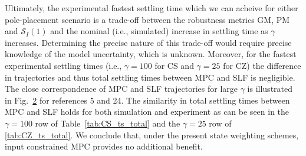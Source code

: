 \documentclass[twocolumn,twoside]{IEEEtran}
\begin{document}
\begin{figure*}[h!]
  \begin{subfigure}{1\columnwidth}
    
    \caption{
    }
  \label{fig:min_gam_traj}
\end{subfigure}
\hfill
\begin{subfigure}{1\columnwidth}
  
  \caption{
  }
  \label{fig:rob_gam_traj}
\end{subfigure}
\caption{Stage output (top row) and control increment (bottom row) experimental trajectories for references 5 and 24 (circled in Fig.~\ref{fig:steps}). (a) Trajectories for the smallest tested values of $\gamma$. (b) Trajectories for the values of $\gamma$ resulting in the fastest total experimental settling time.}
\end{figure*}

Ultimately, the experimental fastest settling time which we can acheive for either pole-placement scenario is a trade-off between the robustness metrics  GM, PM and $\mathcal{S}_I(1)$ and the nominal (i.e., simulated) increase in settling time as $\gamma$ increases. Determining the precise nature of this trade-off would require precise knowledge of the model uncertainty, which is unknown. Moreover, for the fastest experimental settling times (i.e., ${\gamma=100}$ for CS and ${\gamma=25}$ for CZ) the difference in trajectories and thus total settling times between MPC and SLF is negligible. The close correspondence of MPC and SLF trajectories for large $\gamma$ is illustrated in Fig.~\ref{fig:rob_gam_traj} for references 5 and 24. The similarity in total settling times between MPC and SLF holds for both simulation and experiment as can be seen in the ${\gamma=100}$ row of Table~\ref{tab:CS_ts_total} and the ${\gamma=25}$ row of \ref{tab:CZ_ts_total}. We conclude that, under the present state weighting schemes, input constrained MPC provides no additional benefit.
\end{document}
